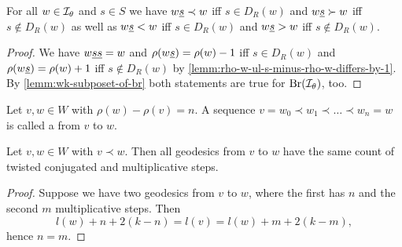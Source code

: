 \begin{prop}
	For all $w \in \mathcal{I}_{\theta}$ and $s \in S$ we have $w \underline{s} \prec w$ iff $s \in D_R(w)$ and $w \underline{s} \succ w$ iff $s \notin D_R(w)$ as well as $w \underline{s} < w$ iff $s \in D_R(w)$ and $w \underline{s} > w$ iff $s \notin D_R(w)$.

	\begin{proof}
		We have $w \underline{s} \underline{s} = w$ and $\rho(w \underline{s}) = \rho(w) - 1$ iff $s \in D_R(w)$ and $\rho(w \underline{s}) = \rho(w) + 1$ iff $s \notin D_R(w)$ by \ref{lemm:rho-w-ul-s-minus-rho-w-differs-by-1}. By \ref{lemm:wk-subposet-of-br} both statements are true for $\operatorname{Br}(\mathcal{I}_{\theta})$, too.
	\end{proof}
\end{prop}

\begin{defi}
	Let $v,w \in W$ with $\rho(w) - \rho(v) = n$. A sequence $v = w_0 \prec w_1 \prec \ldots \prec w_n = w$ is called a  from $v$ to $w$.
\end{defi}

\begin{prop}
	Let $v,w \in W$ with $v \prec w$. Then all geodesics from $v$ to $w$ have the same count of twisted conjugated and multiplicative steps.

	\begin{proof}
		Suppose we have two geodesics from $v$ to $w$, where the first has $n$ and the second $m$ multiplicative steps. Then
		$$ l(w) + n + 2(k-n) = l(v) = l(w) + m + 2(k-m), $$
		hence $n = m$.
	\end{proof}
\end{prop}

\todo